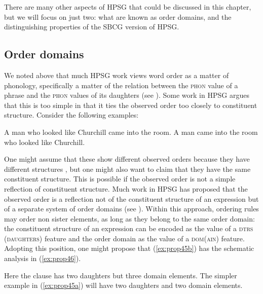 \documentclass[output=paper
	        ,collection
	        ,collectionchapter
 	        ,biblatex
                ,babelshorthands
                ,newtxmath
                ,draftmode
                ,colorlinks, citecolor=brown
]{langscibook}
\begin{document}
There are many other aspects of HPSG that could be discussed in this chapter, but we will focus on just two: what are known as order domains, and the distinguishing properties of the SBCG version of HPSG.

\subsection{Order domains}\label{sec:prop7.1}

We noted above that much HPSG work views word order as a matter of phonology, specifically a matter of the relation between the \textsc{phon} value of a phrase and the \textsc{phon} values of its daughters (see ). Some work in HPSG argues that this is too simple in that it ties the observed order too closely to constituent structure. Consider the following examples:

\ea\label{ex:prop45}
	\ea\label{ex:prop45a}
	A man who looked like Churchill came into the room.
	\ex\label{ex:prop45b}
	A man came into the room who looked like Churchill.
	\z
\z

One might assume that these show different observed orders because they have different structures \citep{Kiss2005a}, but one might also want to claim that they have the same constituent structure. This is possible if the observed order is not a simple reflection of constituent structure. Much work in HPSG has proposed that the observed order is a reflection not of the constituent structure of an expression but of a separate system of order domains (see \citealp{Reape94a,Babel,Kathol2000a}). Within this approach, ordering rules may order non sister elements, as long as they belong to the same order domain: the constituent structure of an expression can be encoded as the value of a \textsc{dtrs (daughters)} feature and the order domain as the value of a \textsc{dom(ain)} feature. Adopting this position, one might propose that (\ref{ex:prop45b}) has the schematic analysis in (\ref{ex:prop46}).

\ea\label{ex:prop46}
\z

Here the clause has two daughters but three domain elements. The simpler example in (\ref{ex:prop45a}) will have two daughters and two domain elements.
\end{document}
